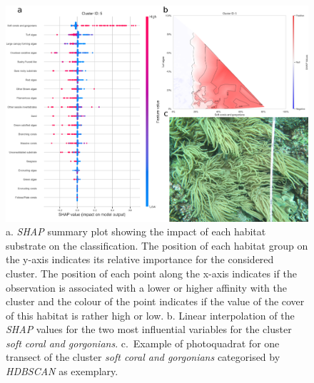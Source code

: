 \begin{figure}
\hypertarget{fig:chap2figS25}{%
\centering
\includegraphics{03-Chapitre2/figures/supplementary/05-explanation_shap_pq_cluster_5.png}
\caption{a. \emph{SHAP} summary plot showing the impact of each habitat
substrate on the classification. The position of each habitat group on
the y-axis indicates its relative importance for the considered cluster.
The position of each point along the x-axis indicates if the observation
is associated with a lower or higher affinity with the cluster and the
colour of the point indicates if the value of the cover of this habitat
is rather high or low. b. Linear interpolation of the \emph{SHAP} values
for the two most influential variables for the cluster \emph{soft coral
and gorgonians}. c.~Example of photoquadrat for one transect of the
cluster \emph{soft coral and gorgonians} categorised by \emph{HDBSCAN}
as exemplary.}\label{fig:chap2figS25}
}
\end{figure}

